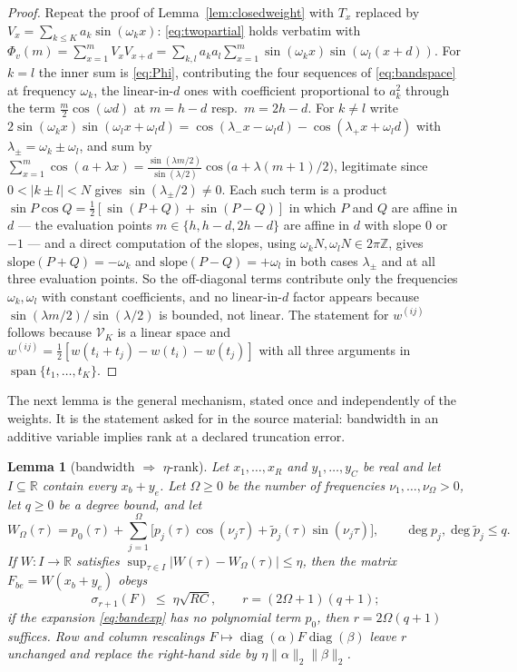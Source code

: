 \documentclass[11pt,a4paper]{article}
\theoremstyle{plain}
\newtheorem{lemma}[theorem]{Lemma}
\theoremstyle{definition}
\newcommand{\R}{\mathbb{R}}
\newcommand{\Z}{\mathbb{Z}}
\DeclareMathOperator{\diag}{diag}
\begin{document}
\begin{proof}
Repeat the proof of Lemma~\ref{lem:closedweight} with $T_x$ replaced by
$V_x=\sum_{k\le K}a_k\sin(\omega_kx)$: \eqref{eq:twopartial} holds verbatim with
$\Phi_v(m)=\sum_{x=1}^{m}V_xV_{x+d}
=\sum_{k,l}a_ka_l\sum_{x=1}^{m}\sin(\omega_kx)\sin(\omega_l(x+d))$. For $k=l$
the inner sum is \eqref{eq:Phi}, contributing the four sequences of
\eqref{eq:bandspace} at frequency $\omega_k$, the linear-in-$d$ ones with
coefficient proportional to $a_k^{2}$ through the term $\tfrac m2\cos(\omega d)$
at $m=h-d$ resp.\ $m=2h-d$. For $k\ne l$ write
$2\sin(\omega_kx)\sin(\omega_lx+\omega_ld)
=\cos(\lambda_-x-\omega_ld)-\cos(\lambda_+x+\omega_ld)$ with
$\lambda_\pm=\omega_k\pm\omega_l$, and sum by
$\sum_{x=1}^{m}\cos(a+\lambda x)
=\frac{\sin(\lambda m/2)}{\sin(\lambda/2)}\cos\bigl(a+\lambda(m+1)/2\bigr)$,
legitimate since $0<|k\pm l|<N$ gives $\sin(\lambda_\pm/2)\ne0$. Each such term
is a product $\sin P\cos Q=\tfrac12[\sin(P+Q)+\sin(P-Q)]$ in which $P$ and $Q$
are affine in $d$ --- the evaluation points $m\in\{h,h-d,2h-d\}$ are affine in
$d$ with slope $0$ or $-1$ --- and a direct computation of the slopes, using
$\omega_kN,\omega_lN\in2\pi\Z$, gives $\mathrm{slope}(P+Q)=-\omega_k$ and
$\mathrm{slope}(P-Q)=+\omega_l$ in both cases $\lambda_\pm$ and at all three
evaluation points. So the off-diagonal terms contribute only the frequencies
$\omega_k,\omega_l$ with constant coefficients, and no linear-in-$d$ factor
appears because $\sin(\lambda m/2)/\sin(\lambda/2)$ is bounded, not linear. The
statement for $w^{(ij)}$ follows because $\mathcal V_K$ is a linear space and
$w^{(ij)}=\tfrac12[w(t_i+t_j)-w(t_i)-w(t_j)]$ with all three arguments in
$\operatorname{span}\{t_1,\dots,t_K\}$.
\end{proof}

The next lemma is the general mechanism, stated once and independently of the
weights. It is the statement asked for in the source material: bandwidth in an
additive variable implies rank at a declared truncation error.

\begin{lemma}[bandwidth $\Rightarrow$ $\eta$-rank]
\label{lem:etarank}
Let $x_1,\dots,x_R$ and $y_1,\dots,y_C$ be real and let $I\subseteq\R$ contain
every $x_b+y_e$. Let $\Omega\ge0$ be the number of frequencies
$\nu_1,\dots,\nu_\Omega>0$, let $q\ge0$ be a degree bound, and let
\begin{equation}
\label{eq:bandexp}
  W_\Omega(\tau)=p_0(\tau)+\sum_{j=1}^{\Omega}
  \bigl[p_j(\tau)\cos(\nu_j\tau)+\tilde p_j(\tau)\sin(\nu_j\tau)\bigr],
  \qquad \deg p_j,\deg\tilde p_j\le q .
\end{equation}
If $W:I\to\R$ satisfies $\sup_{\tau\in I}|W(\tau)-W_\Omega(\tau)|\le\eta$, then
the matrix $F_{be}=W(x_b+y_e)$ obeys
\begin{equation}
\label{eq:etarank}
  \sigma_{r+1}(F)\;\le\;\eta\sqrt{RC},
  \qquad r=(2\Omega+1)(q+1);
\end{equation}
if the expansion \eqref{eq:bandexp} has no polynomial term $p_0$, then
$r=2\Omega(q+1)$ suffices. Row and column rescalings
$F\mapsto\diag(\alpha)F\diag(\beta)$ leave $r$ unchanged and replace the
right-hand side by $\eta\lVert\alpha\rVert_2\lVert\beta\rVert_2$.
\end{lemma}
\end{document}
